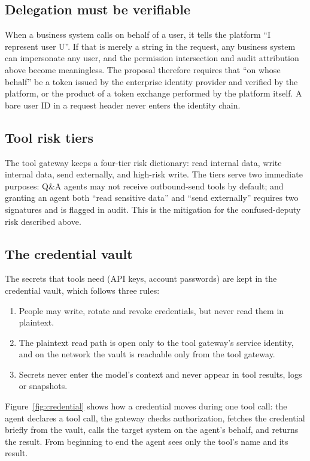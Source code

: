 \subsection{Delegation must be verifiable}

When a business system calls on behalf of a user, it tells the platform ``I represent user U''. If that is merely a string in the request, any business system can impersonate any user, and the permission intersection and audit attribution above become meaningless. The proposal therefore requires that ``on whose behalf'' be a token issued by the enterprise identity provider and verified by the platform, or the product of a token exchange performed by the platform itself. A bare user ID in a request header never enters the identity chain.

\subsection{Tool risk tiers}

The tool gateway keeps a four-tier risk dictionary: read internal data, write internal data, send externally, and high-risk write. The tiers serve two immediate purposes: Q\&A agents may not receive outbound-send tools by default; and granting an agent both ``read sensitive data'' and ``send externally'' requires two signatures and is flagged in audit. This is the mitigation for the confused-deputy risk described above.

\subsection{The credential vault}

The secrets that tools need (API keys, account passwords) are kept in the credential vault, which follows three rules:

\begin{enumerate}
  \item People may write, rotate and revoke credentials, but never read them in plaintext.
  \item The plaintext read path is open only to the tool gateway's service identity, and on the network the vault is reachable only from the tool gateway.
  \item Secrets never enter the model's context and never appear in tool results, logs or snapshots.
\end{enumerate}

Figure~\ref{fig:credential} shows how a credential moves during one tool call: the agent declares a tool call, the gateway checks authorization, fetches the credential briefly from the vault, calls the target system on the agent's behalf, and returns the result. From beginning to end the agent sees only the tool's name and its result.

